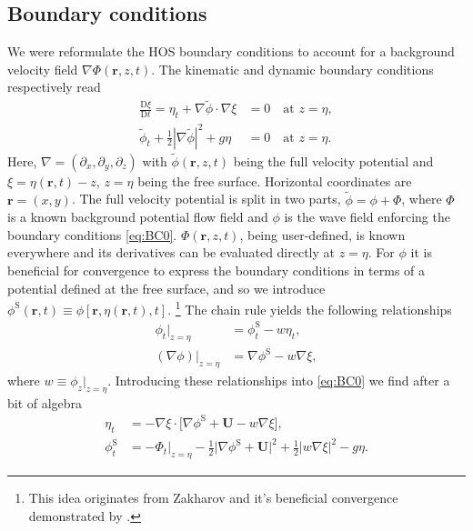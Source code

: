 \documentclass[a4paper,12pt]{article}
\newcommand{\mr}{\mathrm}
\renewcommand{\S}{^\mr{S}}
\newcommand{\phit}{\tilde\phi}
\renewcommand{\_}[1]{_\mr{#1}}
\newcommand{\rr}{\bm r}%
\newcommand{\w}{w}
\newcommand{\bU}{\bm U}
\begin{document}
\subsection{Boundary conditions}
\label{sec:BC}
We were reformulate the HOS boundary conditions to account for a background velocity field $\nabla \Phi(\rr,z,t)$.
The kinematic and dynamic boundary conditions respectively read
\begin{subequations}
\begin{align}
\frac{\mr D \xi}{\mr D t}  = \eta_t + \nabla \phit \cdot\nabla \xi &= 0  \quad \text{at }z = \eta, 
\\
\phit_t + \frac12|\nabla\phit|^2 + g\eta &= 0  \quad  \text{at }z = \eta.
\end{align}%
\label{eq:BC0}%
\end{subequations}%
Here, $\nabla=(\partial_x,\partial_y,\partial_z)$  with $\phit(\rr,z,t)$ being the full velocity potential and $\xi = \eta(\rr,t)-z$, $z = \eta$ being the free surface.
Horizontal coordinates are $\rr=(x,y)$.
The full velocity potential is split in two parts, $\phit = \phi + \Phi$, where $\Phi$ is a known background potential flow field and $\phi$ is the wave field enforcing the boundary conditions \eqref{eq:BC0}.
$\Phi(\rr,z,t)$, being user-defined, is known everywhere and its derivatives can be evaluated directly at $z=\eta$.
For $\phi$ it is beneficial for convergence to express the boundary conditions in terms of a potential defined at the free surface, and so we introduce 
$\phi\S(\rr,t) \equiv \phi[\rr,\eta(\rr,t),t]$.%
\footnote{This idea originates from Zakharov and it's beneficial convergence demonstrated by \citet{west1981deep}.}
The chain rule yields the following relationships
\begin{align*}
\phi_t\big|_{z=\eta} &= \phi_t\S - \w\eta_t,\\
(\nabla\phi)\big|_{z=\eta}  &= \nabla\phi\S - \w\nabla\xi , 
\end{align*}
where $\w\equiv \phi_z\big|_{z=\eta}$. 
Introducing these relationships into \eqref{eq:BC0} we find after a bit of algebra
\begin{subequations}
\begin{align}
\eta_t &= - \nabla \xi\cdot\big[\nabla\phi\S + \bU - \w\nabla\xi\big], 
\\
\phi\S_t &= -\Phi_t\big|_{z=\eta} - \frac12\big|\nabla\phi\S + \bU\big|^2 + \frac12|\w\nabla\xi|^2 - g\eta.
\end{align}
\label{eq:BCS}
\end{subequations}
\end{document}
